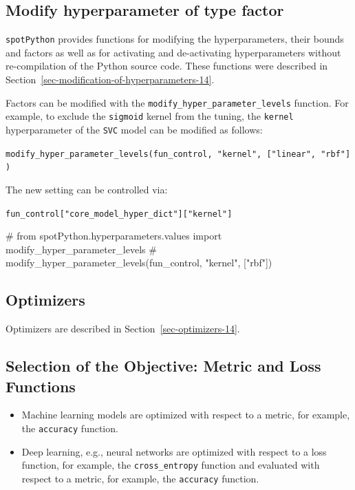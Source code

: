 \documentclass[
  letterpaper,
  DIV=11,
  numbers=noendperiod]{scrreprt}
\newenvironment{Shaded}{\begin{snugshade}}{\end{snugshade}}
\newcommand{\CommentTok}[1]{\textcolor[rgb]{0.37,0.37,0.37}{#1}}
\providecommand{\tightlist}{%
  \setlength{\itemsep}{0pt}\setlength{\parskip}{0pt}}\usepackage{longtable,booktabs,array}
\begin{document}
\hypertarget{modify-hyperparameter-of-type-factor-5}{%
\subsection{Modify hyperparameter of type
factor}\label{modify-hyperparameter-of-type-factor-5}}

\texttt{spotPython} provides functions for modifying the
hyperparameters, their bounds and factors as well as for activating and
de-activating hyperparameters without re-compilation of the Python
source code. These functions were described in
Section~\ref{sec-modification-of-hyperparameters-14}.

Factors can be modified with the
\texttt{modify\_hyper\_parameter\_levels} function. For example, to
exclude the \texttt{sigmoid} kernel from the tuning, the \texttt{kernel}
hyperparameter of the \texttt{SVC} model can be modified as follows:

\texttt{modify\_hyper\_parameter\_levels(fun\_control,\ "kernel",\ {[}"linear",\ "rbf"{]})}

The new setting can be controlled via:

\texttt{fun\_control{[}"core\_model\_hyper\_dict"{]}{[}"kernel"{]}}

\begin{Shaded}
\begin{Highlighting}[]
\CommentTok{\# from spotPython.hyperparameters.values import modify\_hyper\_parameter\_levels}
\CommentTok{\# modify\_hyper\_parameter\_levels(fun\_control, "kernel", ["rbf"])}
\end{Highlighting}
\end{Shaded}

\hypertarget{sec-optimizers-19}{%
\subsection{Optimizers}\label{sec-optimizers-19}}

Optimizers are described in Section~\ref{sec-optimizers-14}.

\hypertarget{selection-of-the-objective-metric-and-loss-functions-3}{%
\subsection{Selection of the Objective: Metric and Loss
Functions}\label{selection-of-the-objective-metric-and-loss-functions-3}}

\begin{itemize}
\tightlist
\item
  Machine learning models are optimized with respect to a metric, for
  example, the \texttt{accuracy} function.
\item
  Deep learning, e.g., neural networks are optimized with respect to a
  loss function, for example, the \texttt{cross\_entropy} function and
  evaluated with respect to a metric, for example, the \texttt{accuracy}
  function.
\end{itemize}
\end{document}
